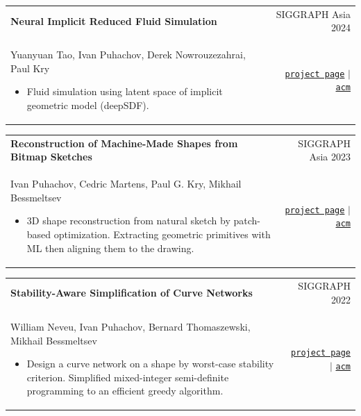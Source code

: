 \documentclass[a4paper,20pt]{article}
\makeatletter
\newcommand{\experienceSmallheading}[4]{
	\vspace{-3pt}
	\item
	\begin{tabular*}{0.97\textwidth}[t]{@{}p{0.75\textwidth}@{\extracolsep{\fill}}r@{}}
		#1 & #2\\ 
		#3 & #4 \\
	\end{tabular*}\vspace{-5pt}
}
\makeatother
\begin{document}
	\vspace{3pt}
	\experienceSmallheading
	{
		\textbf{Neural Implicit Reduced Fluid Simulation}
	}
	{
		SIGGRAPH Asia 2024
	}
	{
		Yuanyuan Tao, Ivan Puhachov, Derek Nowrouzezahrai, Paul Kry
		\begin{itemize}[leftmargin=*, topsep=0pt, partopsep=0pt, itemsep=0pt, parsep=0pt]
		\item
		Fluid simulation using latent space of implicit geometric model (deepSDF).
		\end{itemize}
		\vspace{-5mm}
	}
	{
		\href{https://yuanyuantao.github.io/Neural-Implicit-Reduced-Fluid-Simulation/}{\texttt{project page}}
		$|$ 
		\href{https://dl.acm.org/doi/10.1145/3680528.3687628}{\texttt{acm}}}

	\vspace{3pt}
	\experienceSmallheading
	{\textbf{Reconstruction of Machine-Made Shapes from Bitmap Sketches}}
	{SIGGRAPH Asia 2023}
	{
		Ivan Puhachov, Cedric Martens, Paul G. Kry, Mikhail Bessmeltsev 
		\begin{itemize}[leftmargin=*, topsep=0pt, partopsep=0pt, itemsep=0pt, parsep=0pt]
		\item 3D shape reconstruction from natural sketch by patch-based optimization.\newline
		Extracting geometric primitives with ML then aligning them to the drawing.
		\end{itemize}
		\vspace{-5mm}
	}
	{
		\href{https://puhachov.xyz/publications/machine-made-sketch-reconstruction/}{\texttt{project page}}
		$|$ 
		\href{https://dl.acm.org/doi/10.1145/3618361}{\texttt{acm}}}
	
	\vspace{3pt}
	
	\experienceSmallheading
	{\textbf{Stability-Aware Simplification of Curve Networks}}
	{SIGGRAPH 2022}
	{
		William Neveu, Ivan Puhachov, Bernard Thomaszewski, Mikhail Bessmeltsev \begin{itemize}[leftmargin=*, topsep=0pt, partopsep=0pt, itemsep=0pt, parsep=0pt]
		\item Design a curve network on a shape by worst-case stability criterion. \newline
		Simplified mixed-integer semi-definite programming to an efficient greedy algorithm.
		\end{itemize}
		\vspace{-5mm}
	}
	{
		\href{http://www-labs.iro.umontreal.ca/~bmpix/curve_networks/}{\texttt{project page}}
		$|$ 
		\href{https://dl.acm.org/doi/10.1145/3528233.3530711}{\texttt{acm}}}
	
\end{document}
